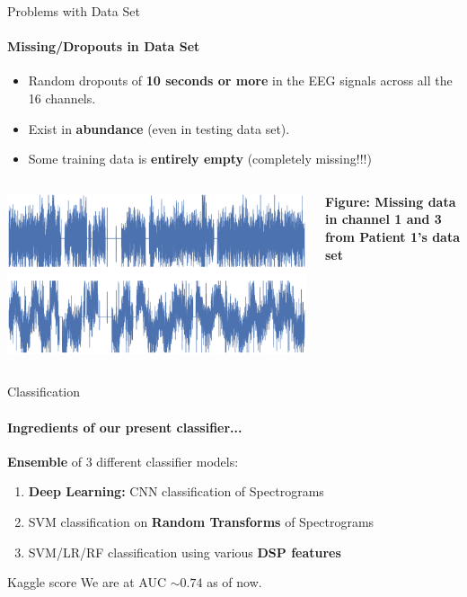\documentclass{beamer}
\begin{document}
\begin{frame}{Problems with Data Set}
  \framesubtitle{Missing/Dropouts in Data Set}

  \begin{block}{}
    \begin{itemize}
    \item Random dropouts of \textbf{10 seconds or more} in the EEG signals across all the 16 channels.
    \item Exist in \textbf{abundance} (even in testing data set).
    \item Some training data is \textbf{entirely empty} (completely missing!!!)
    \end{itemize}
  \end{block}

  \begin{columns}
    \includegraphics[scale=0.13]{img/data_drops2.eps}

    \textbf{Figure: Missing data in channel 1 and 3 from Patient 1's data set}
  \end{columns}
\end{frame}

\begin{frame}{Classification}
  \framesubtitle{Ingredients of our present classifier...}

  \textbf{Ensemble} of 3 different classifier models:
  
  \begin{enumerate}
  \item \textbf{Deep Learning:} CNN classification of Spectrograms
  \item SVM classification on \textbf{Random Transforms} of Spectrograms
  \item SVM/LR/RF  classification using various \textbf{DSP features}
  \end{enumerate}

  \pause
  \begin{block}{Kaggle score}
    We are at AUC $\boldsymbol{\sim 0.74}$ as of now.
  \end{block}
\end{frame}
\end{document}
